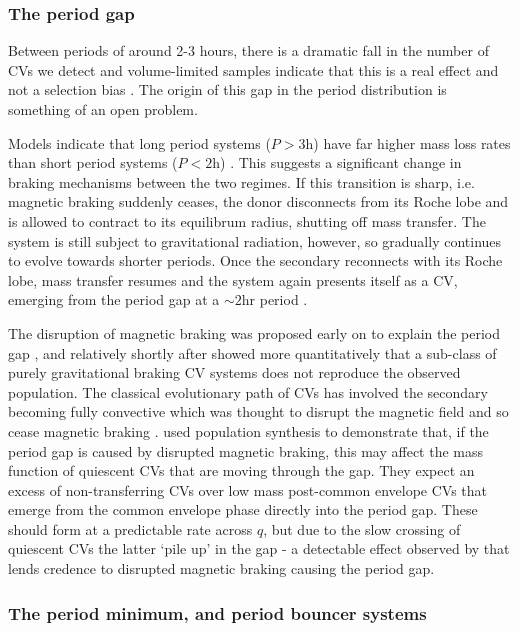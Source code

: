 \subsubsection{The period gap}
\label{sect:introduction:period gap}

Between periods of around 2-3 hours, there is a dramatic fall in the number of CVs we detect and volume-limited samples indicate that this is a real effect and not a selection bias \citep{Kolb1998,pala2020}. The origin of this gap in the period distribution is something of an open problem.

Models indicate that long period systems ($P > 3$h) have far higher mass loss rates than short period systems ($P < 2$h) \citep{ritter1985}. This suggests a significant change in braking mechanisms between the two regimes. 
If this transition is sharp, i.e. magnetic braking suddenly ceases, the donor disconnects from its Roche lobe and is allowed to contract to its equilibrum radius, shutting off mass transfer.
The system is still subject to gravitational radiation, however, so gradually continues to evolve towards shorter periods. Once the secondary reconnects with its Roche lobe, mass transfer resumes and the system again presents itself as a CV, emerging from the period gap at a $\sim2$hr period \citep{kolb2002}.

The disruption of magnetic braking was proposed early on to explain the period gap \citep{rappaport1983, spruit1983}, and relatively shortly after \citet{kolb1993} showed more quantitatively that a sub-class of purely gravitational braking CV systems does not reproduce the observed population. 
The classical evolutionary path of CVs has involved the secondary becoming fully convective which was thought to disrupt the magnetic field and so cease magnetic braking \citep{knigge11}.
\citet{Davis2008} used population synthesis to demonstrate that, if the period gap is caused by disrupted magnetic braking, this may affect the mass function of quiescent CVs that are moving through the gap. They expect an excess of non-transferring CVs over low mass post-common envelope CVs that emerge from the common envelope phase directly into the period gap. These should form at a predictable rate across $q$, but due to the slow crossing of quiescent CVs the latter `pile up' in the gap - a detectable effect observed by \citet{zorotovic2011} that lends credence to disrupted magnetic braking causing the period gap.


\subsubsection{The period minimum, and period bouncer systems}
\label{sect:introduction:period minimum and bouncers}

